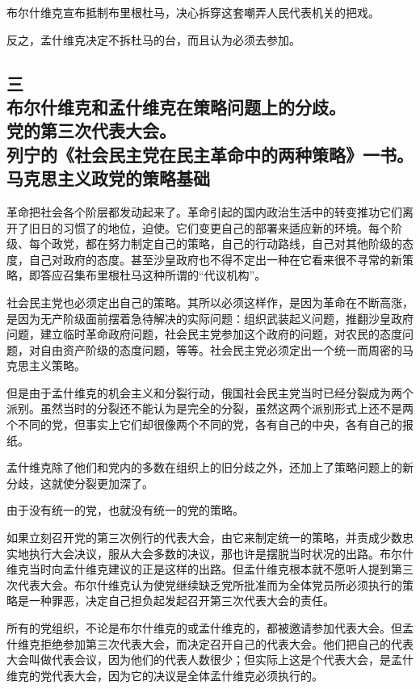 布尔什维克宣布抵制布里根杜马，决心拆穿这套嘲弄人民代表机关的把戏。

反之，孟什维克决定不拆杜马的台，而且认为必须去参加。


\subsection[三\q 布尔什维克和孟什维克在策略问题上的分歧。党的第三次代表大会。列宁的《社会民主党在民主革命中的两种策略》一书。马克思主义政党的策略基础]{三\\ 布尔什维克和孟什维克在策略问题上的分歧。\\ 党的第三次代表大会。\\ 列宁的《社会民主党在民主革命中的两种策略》一书。\\ 马克思主义政党的策略基础}

革命把社会各个阶层都发动起来了。革命引起的国内政治生活中的转变推功它们离开了旧日的习惯了的地位，迫使。它们变更自己的部署来适应新的环境。每个阶级、每个政党，都在努力制定自己的策略，自己的行动路线，自己对其他阶级的态度，自己对政府的态度。甚至沙皇政府也不得不定出一种在它看来很不寻常的新策略，即答应召集布里根杜马这种所谓的“代议机构”。

社会民主党也必须定出自己的策略。其所以必须这样作，是因为革命在不断高涨，是因为无产阶级面前摆着急待解决的实际问题：组织武装起义问题，推翻沙皇政府问题，建立临时革命政府问题，社会民主党参加这个政府的问题，对农民的态度问题，对自由资产阶级的态度问题，等等。社会民主党必须定出一个统一而周密的马克思主义策略。

但是由于孟什维克的机会主义和分裂行动，俄国社会民主党当时已经分裂成为两个派别。虽然当时的分裂还不能认为是完全的分裂，虽然这两个派别形式上还不是两个不同的党，但事实上它们却很像两个不同的党，各有自己的中央，各有自己的报纸。

孟什维克除了他们和党内的多数在组织上的旧分歧之外，还加上了策略问题上的新分歧，这就使分裂更加深了。

由于没有统一的党，也就没有统一的党的策略。

如果立刻召开党的第三次例行的代表大会，由它来制定统一的策略，并责成少数忠实地执行大会决议，服从大会多数的决议，那也许是摆脱当时状况的出路。布尔什维克当时向孟什维克建议的正是这样的出路。但孟什维克根本就不愿听人提到第三次代表大会。布尔什维克认为使党继续缺乏党所批准而为全体党员所必须执行的策略是一种罪恶，决定自己担负起发起召开第三次代表大会的责任。

所有的党组织，不论是布尔什维克的或孟什维克的，都被邀请参加代表大会。但孟什维克拒绝参加第三次代表大会，而决定召开自己的代表大会。他们把自己的代表大会叫做代表会议，因为他们的代表人数很少；但实际上这是个代表大会，是孟什维克的党代表大会，因为它的决议是全体孟什维克必须执行的。

